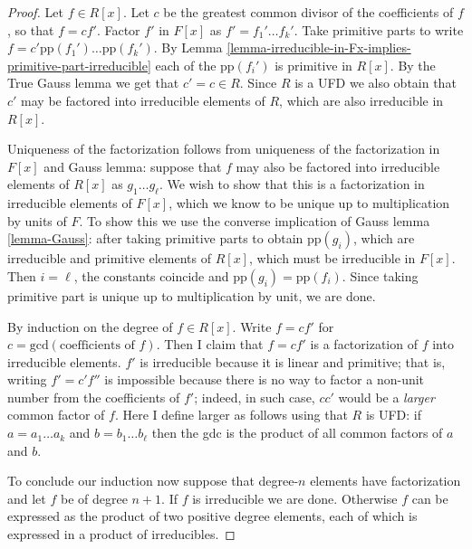 \begin{proof}
Let $f\in R[x]$. Let $c$ be the greatest common divisor of the coefficients of
$f$, so that $f=cf'$. Factor $f'$ in $F[x]$ as $f'=f_1'\ldots f_k'$. Take
primitive parts to write $f=c'\text{pp}(f_1')\ldots \text{pp}(f_k')$. By Lemma
\ref{lemma-irreducible-in-Fx-implies-primitive-part-irreducible} each of the
$\text{pp}(f_i')$ is primitive in $R[x]$. By the True Gauss lemma we get that
$c'=c\in R$. Since $R$ is a UFD we also obtain that
$c'$ may be factored into irreducible elements of $R$, which are also
irreducible in $R[x]$.

Uniqueness of the factorization follows from uniqueness of the factorization in
$F[x]$ and Gauss lemma: suppose that $f$ may also be factored into irreducible
elements of $R[x]$ as $g_1\ldots g_\ell$. We wish to show that this is a
factorization in irreducible elements of $F[x]$, which we know to be unique up
to multiplication by units of $F$. To show this we use the converse implication
of Gauss lemma \ref{lemma-Gauss}: after taking primitive parts to obtain
$\text{pp}(g_i)$, which are irreducible and primitive elements of $R[x]$, which
must be irreducible in $F[x]$. Then $i=\ell$, the constants coincide and
$\text{pp}(g_i)=\text{pp}(f_i)$. Since taking primitive part is unique up to
multiplication by unit, we are done.

By induction on the degree of $f \in R[x]$. Write $f=cf'$ for
$c=\text{gcd}(\text{coefficients of $f$})$. Then I claim that $f=cf'$ is a
factorization of $f$ into irreducible elements. $f'$ is irreducible because it
is linear and primitive; that is, writing $f'=c'f''$ is impossible because
there is no way to factor a non-unit number from the coefficients of $f'$;
indeed, in such case, $cc'$ would be a {\it larger} common factor of $f$. Here I
define larger as follows using that $R$ is UFD: if $a=a_1\ldots a_k$ and
$b=b_1\ldots b_\ell$ then the gdc is the product of all common factors of $a$
and $b$.

To conclude our induction now suppose that degree-$n$ elements have
factorization and let $f$ be of degree $n+1$. If $f$ is irreducible we are done.
Otherwise $f$ can be expressed as the product of two positive degree elements,
each of which is expressed in a product of irreducibles.
\end{proof}







